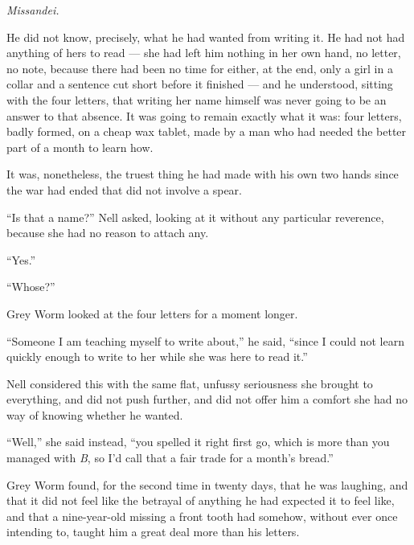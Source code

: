 \textit{Missandei.}

He did not know, precisely, what he had wanted from writing it. He had not had anything of hers to read — she had left him nothing in her own hand, no letter, no note, because there had been no time for either, at the end, only a girl in a collar and a sentence cut short before it finished — and he understood, sitting with the four letters, that writing her name himself was never going to be an answer to that absence. It was going to remain exactly what it was: four letters, badly formed, on a cheap wax tablet, made by a man who had needed the better part of a month to learn how.

It was, nonetheless, the truest thing he had made with his own two hands since the war had ended that did not involve a spear.

“Is that a name?” Nell asked, looking at it without any particular reverence, because she had no reason to attach any.

“Yes.”

“Whose?”

Grey Worm looked at the four letters for a moment longer.

“Someone I am teaching myself to write about,” he said, “since I could not learn quickly enough to write to her while she was here to read it.”

Nell considered this with the same flat, unfussy seriousness she brought to everything, and did not push further, and did not offer him a comfort she had no way of knowing whether he wanted.

“Well,” she said instead, “you spelled it right first go, which is more than you managed with \textit{B}, so I’d call that a fair trade for a month’s bread.”

Grey Worm found, for the second time in twenty days, that he was laughing, and that it did not feel like the betrayal of anything he had expected it to feel like, and that a nine-year-old missing a front tooth had somehow, without ever once intending to, taught him a great deal more than his letters.